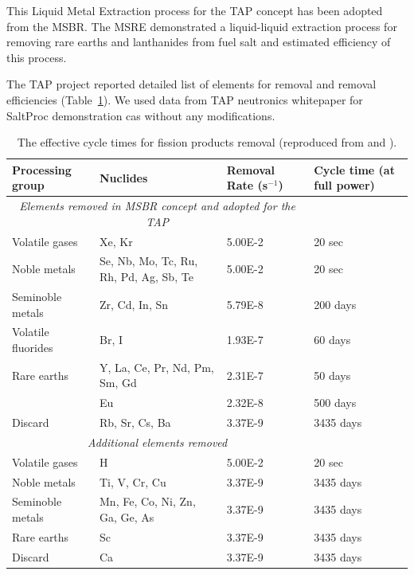 \documentclass[12pt]{article} %
\begin{document}
This Liquid Metal Extraction process for the \gls{TAP} concept has been adopted from 
the \gls{MSBR}. The \gls{MSRE} demonstrated a liquid-liquid extraction process 
for removing rare earths and lanthanides from fuel salt and estimated efficiency of this process.

The \gls{TAP} project reported detailed list of elements for removal and removal efficiencies (Table~\ref{tab:reprocessing_list}). We used data from \gls{TAP} neutronics whitepaper\cite{transatomic_power_corporation_neutronics_2016} for SaltProc demonstration cas without any modifications.
\begin{table}[ht!]
        \centering
        \caption{The effective cycle times for fission products removal (reproduced from \cite{betzler_implementation_2017} and \cite{transatomic_power_corporation_neutronics_2016}).}
        \begin{tabular}{p{} p{} p{} p{}}
        \hline 
        Processing group & \qquad\qquad\qquad Nuclides & Removal Rate (s$^{-1}$) & Cycle time (at full power) \\ [5pt] \hline 
 \multicolumn{3}{c}{\textit{Elements removed in \gls{MSBR} concept and adopted for the \gls{TAP}} \cite{robertson_conceptual_1971}} \\
        Volatile gases & Xe, Kr								  & 5.00E-2 & 20 sec \\ [5pt]
        Noble metals & Se, Nb, Mo, Tc, Ru, Rh, Pd, Ag, Sb, Te & 5.00E-2 & 20 sec \\ [5pt]
        Seminoble metals & Zr, Cd, In, Sn	  				  & 5.79E-8 & 200 days \\ [5pt]
        Volatile fluorides & Br, I 							  & 1.93E-7 & 60 days \\ [5pt]
        Rare earths & Y, La, Ce, Pr, Nd, Pm, Sm, Gd           & 2.31E-7 & 50 days \\ [5pt]
        \qquad & Eu & 2.32E-8 & 500 days \\ [5pt]
        Discard & Rb, Sr, Cs, Ba & 3.37E-9 & 3435 days \\ [5pt] 
        \hline
 
 \multicolumn{3}{c}{\textit{Additional elements removed} \cite{transatomic_power_corporation_neutronics_2016, betzler_implementation_2017}  } \\
        Volatile gases & H								  	& 5.00E-2 & 20 sec    \\ [5pt]
        Noble metals & Ti, V, Cr, Cu						& 3.37E-9 & 3435 days \\ [5pt]
        Seminoble metals & Mn, Fe, Co, Ni, Zn, Ga, Ge, As   & 3.37E-9 & 3435 days \\ [5pt]
        Rare earths & Sc									& 3.37E-9 & 3435 days \\ [5pt]
        Discard & Ca										& 3.37E-9 & 3435 days \\ [5pt] 
        \hline
        \end{tabular}
        \label{tab:reprocessing_list}
          \vspace{-0.9em}
\end{table}
\end{document}
